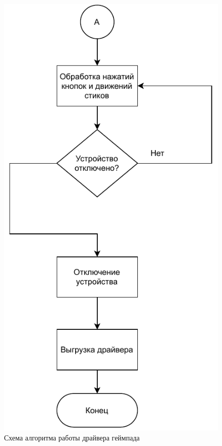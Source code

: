 \begin{figure}[h!]
	\centering
	\includegraphics[scale=1.5]{img/driver-work2.pdf}
	\caption{Схема алгоритма работы драйвера геймпада}
	\label{driver-work2}
\end{figure}

\pagebreak